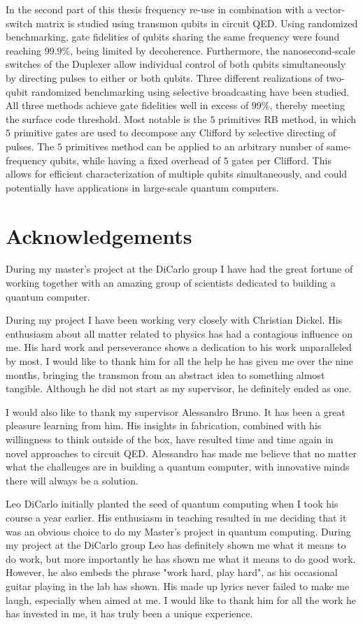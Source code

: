 \documentclass[12pt]{report}
\begin{document}
In the second part of this thesis frequency re-use in combination with a vector-switch matrix is studied using transmon qubits in circuit QED. Using randomized benchmarking, gate fidelities of qubits sharing the same frequency were found reaching $99.9\%$, being limited by decoherence. Furthermore, the nanosecond-scale switches of the Duplexer allow individual control of both qubits simultaneously by directing pulses to either or both qubits. Three different realizations of two-qubit randomized benchmarking using selective broadcasting have been studied. All three methods achieve gate fidelities well in excess of $99\%$, thereby meeting the surface code threshold. Most notable is the $5$ primitives RB method, in which $5$ primitive gates are used to decompose any Clifford by selective directing of pulses. The $5$ primitives method can be applied to an arbitrary number of same-frequency qubits, while having a fixed overhead of $5$ gates per Clifford. This allows for efficient characterization of multiple qubits simultaneously, and could potentially have applications in large-scale quantum computers.

\chapter*{Acknowledgements}

During my master's project at the DiCarlo group I have had the great fortune of working together with an amazing group of scientists dedicated to building a quantum computer.

During my project I have been working very closely with Christian Dickel. His enthusiasm about all matter related to physics has had a contagious influence on me. His hard work and perseverance shows a dedication to his work unparalleled by most. I would like to thank him for all the help he has given me over the nine months, bringing the transmon from an abstract idea to something almost tangible. Although he did not start as my supervisor, he definitely ended as one.

I would also like to thank my supervisor Alessandro Bruno. It has been a great pleasure learning from him. His insights in fabrication, combined with his willingness to think outside of the box, have resulted time and time again in novel approaches to circuit QED. Alessandro has made me believe that no matter what the challenges are in building a quantum computer, with innovative minds there will always be a solution.

Leo DiCarlo initially planted the seed of quantum computing when I took his course a year earlier. His enthusiasm in teaching resulted in me deciding that it was an obvious choice to do my Master's project in quantum computing. During my project at the DiCarlo group Leo has definitely shown me what it means to do work, but more importantly he has shown me what it means to do good work. However, he also embeds the phrase "work hard, play hard", as his occasional guitar playing in the lab has shown. His made up lyrics never failed to make me laugh, especially when aimed at me. I would like to thank him for all the work he has invested in me, it has truly been a unique experience.
\end{document}
